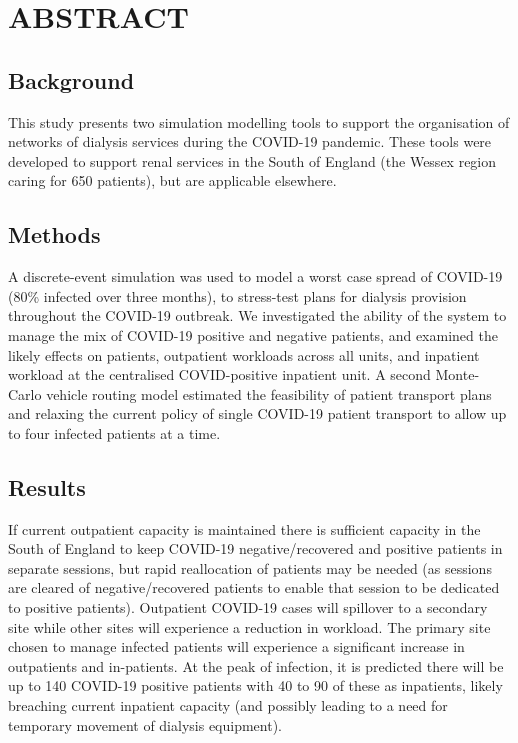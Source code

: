 \section*{ABSTRACT}

\subsection*{Background}
This study presents two simulation modelling tools to support the organisation of networks of dialysis services during the COVID-19 pandemic. These tools were developed to support renal services in the South of England (the Wessex region caring for 650 patients), but are applicable elsewhere. 

\subsection*{Methods}
A discrete-event simulation was used to model a worst case spread of COVID-19 (80\%  infected over three months), to stress-test plans for dialysis provision throughout the COVID-19 outbreak. We investigated the ability of the system to manage the mix of COVID-19 positive and negative patients, and examined the likely effects on patients, outpatient workloads across all units, and inpatient workload at the centralised COVID-positive inpatient unit. A second Monte-Carlo vehicle routing model estimated the feasibility of patient transport plans and relaxing the current policy of single COVID-19 patient transport to allow up to four infected patients at a time.

\subsection*{Results}

If current outpatient capacity is maintained there is sufficient capacity in the South of England to keep COVID-19 negative/recovered and positive patients in separate sessions, but rapid reallocation of patients may be needed (as sessions are cleared of negative/recovered patients to enable that session to be dedicated to positive patients). Outpatient COVID-19 cases will spillover to a secondary site while other sites will experience a reduction in workload. The primary site chosen to manage infected patients will experience a significant increase in outpatients and in-patients. At the peak of infection, it is predicted there will be up to 140 COVID-19 positive patients with 40 to 90 of these as inpatients, likely breaching current inpatient capacity (and possibly leading to a need for temporary movement of dialysis equipment).

